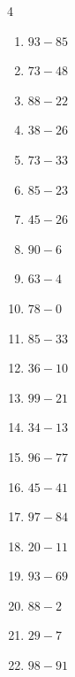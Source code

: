 \begin{multicols}{4}
\begin{enumerate}
  \item $93-85$
        \phantom{$=8$}

  \item $73-48$
        \phantom{$=25$}

  \item $88-22$
        \phantom{$=66$}

  \item $38-26$
        \phantom{$=12$}

  \item $73-33$
        \phantom{$=40$}

  \item $85-23$
        \phantom{$=62$}

  \item $45-26$
        \phantom{$=19$}

  \item $90-6$
        \phantom{$=84$}

  \item $63-4$
        \phantom{$=59$}

  \item $78-0$
        \phantom{$=78$}

  \item $85-33$
        \phantom{$=52$}

  \item $36-10$
        \phantom{$=26$}

  \item $99-21$
        \phantom{$=78$}

  \item $34-13$
        \phantom{$=21$}

  \item $96-77$
        \phantom{$=19$}

  \item $45-41$
        \phantom{$=4$}

  \item $97-84$
        \phantom{$=13$}

  \item $20-11$
        \phantom{$=9$}

  \item $93-69$
        \phantom{$=24$}

  \item $88-2$
        \phantom{$=86$}

  \item $29-7$
        \phantom{$=22$}

  \item $98-91$
        \phantom{$=7$}


\end{enumerate}
\end{multicols}
